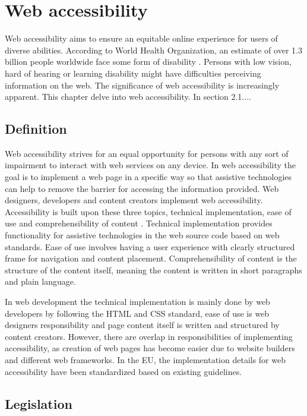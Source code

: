 \chapter{Web accessibility\label{accessibility}}

Web accessibility aims to ensure an equitable online experience for users of diverse abilities. According to World Health Organization, an estimate of over 1.3 billion people worldwide face some form of disability \citep{whodisability}. Persons with low vision, hard of hearing or learning disability might have difficulties perceiving information on the web. The significance of web accessibility is increasingly apparent. This chapter delve into web accessibility. In section 2.1....

\section{Definition}

Web accessibility strives for an equal opportunity for persons with any sort of impairment to interact with web services on any device. In web accessibility the goal is to implement a web page in a specific way so that assistive technologies can help to remove the barrier for accessing the information provided. Web designers, developers and content creators implement web accessibility. Accessibility is built upon these three topics, technical implementation, ease of use and comprehensibility of content \citep{webaccessibilitydefinition}. Technical implementation provides functionality for assistive technologies in the web source code based on web standards. Ease of use involves having a user experience with clearly structured frame for navigation and content placement. Comprehensibility of content is the structure of the content itself, meaning the content is written in short paragraphs and plain language. 

In web development the technical implementation is mainly done by web developers by following the HTML and CSS standard, ease of use is web designers responsibility and page content itself is written and structured by content creators. However, there are overlap in responsibilities of implementing accessibility, as creation of web pages has become easier due to website builders and different web frameworks. In the EU, the implementation details for web accessibility have been standardized based on existing guidelines.

\section{Legislation}

